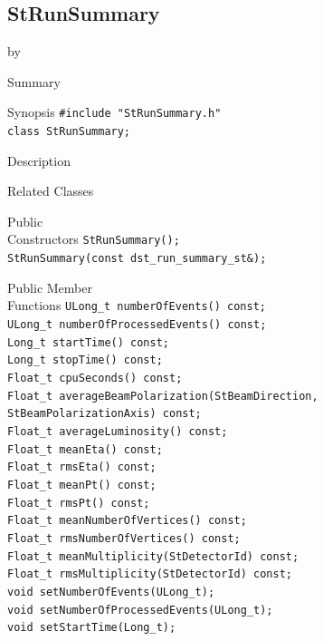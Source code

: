 \documentclass[twoside]{article}
\newcommand{\entrylabel}[1]{\mbox{\textbf{{#1}}}\hfil}%
\newenvironment{entry}
{\begin{list}{}%
    {\renewcommand{\makelabel}{\entrylabel}%
     \setlength{\labelwidth}{90pt}%
     \setlength{\leftmargin}{\labelwidth}
     \advance\leftmargin by \labelsep%
      }%
    }%
  {\end{list}}
\newcommand{\Entrylabel}[1]%
{\raisebox{0pt}[1ex][0pt]{\makebox[\labelwidth][l]%
    {\parbox[t]{\labelwidth}{\hspace{0pt}\textbf{{#1}}}}}}
\newenvironment{Entry}%
{\renewcommand{\entrylabel}{\Entrylabel}\begin{entry}}%
  {\end{entry}}
\begin{document}
\subsection{StRunSummary}
\label{sec:StRunSummary}
\begin{Entry}
\item[Summary]
\item[Synopsis]
    \verb+#include "StRunSummary.h"+\\
    \verb+class StRunSummary;+\\
\item[Description]
\item[Related Classes]
\item[Public\\ Constructors]
    \verb+StRunSummary();+\\
    \verb+StRunSummary(const dst_run_summary_st&);+\\
\item[Public Member\\ Functions]
    \verb+ULong_t numberOfEvents() const;+\\
    \verb+ULong_t numberOfProcessedEvents() const;+\\
    \verb+Long_t startTime() const;+\\
    \verb+Long_t stopTime() const;+\\
    \verb+Float_t cpuSeconds() const;+\\
    \verb+Float_t averageBeamPolarization(StBeamDirection, StBeamPolarizationAxis) const;+\\
    \verb+Float_t averageLuminosity() const;+\\
    \verb+Float_t meanEta() const;+\\
    \verb+Float_t rmsEta() const;+\\
    \verb+Float_t meanPt() const;+\\
    \verb+Float_t rmsPt() const;+\\
    \verb+Float_t meanNumberOfVertices() const;+\\
    \verb+Float_t rmsNumberOfVertices() const;+\\
    \verb+Float_t meanMultiplicity(StDetectorId) const;+\\
    \verb+Float_t rmsMultiplicity(StDetectorId) const;+\\
    \verb+void setNumberOfEvents(ULong_t);+\\
    \verb+void setNumberOfProcessedEvents(ULong_t);+\\
    \verb+void setStartTime(Long_t);+\\

\end{Entry}
\end{document}
